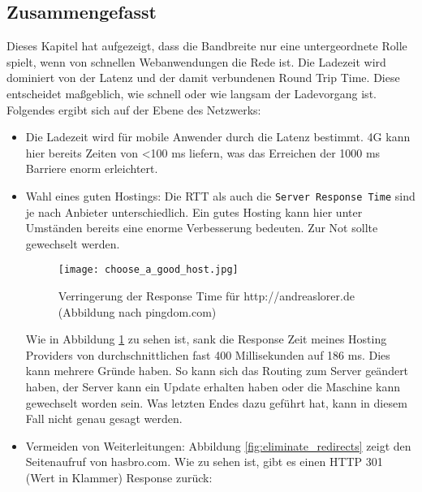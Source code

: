 
	\subsection{Zusammengefasst} %
	\label{sub:zusammengefasst_grundlagen}
		Dieses Kapitel hat aufgezeigt, dass die Bandbreite nur eine untergeordnete Rolle spielt, wenn von schnellen Webanwendungen die Rede ist. Die Ladezeit wird dominiert von der Latenz und der damit verbundenen Round Trip Time. Diese entscheidet maßgeblich, wie schnell oder wie langsam der Ladevorgang ist.
		Folgendes ergibt sich auf der Ebene des Netzwerks:
		\begin{itemize}

			\item Die Ladezeit wird für mobile Anwender durch die Latenz bestimmt. 4G kann hier bereits Zeiten von <100 ms liefern, was das Erreichen der 1000 ms Barriere enorm erleichtert.

			\item Wahl eines guten Hostings: Die RTT als auch die \texttt{Server Response Time} sind je nach Anbieter unterschiedlich. Ein gutes Hosting kann hier unter Umständen bereits eine enorme Verbesserung bedeuten. Zur Not sollte gewechselt werden.

			\begin{figure}[htbp]
				\begin{center}
					\texttt{[image: choose\_a\_good\_host.jpg]}
					\caption{Verringerung der Response Time für http://andreaslorer.de (Abbildung nach pingdom.com)}
					\label{fig:choose_a_good_host}
				\end{center}
			\end{figure}
			
			Wie in Abbildung \ref{fig:choose_a_good_host} zu sehen ist, sank die Response Zeit meines Hosting Providers von durchschnittlichen fast 400 Millisekunden auf 186 ms. Dies kann mehrere Gründe haben. So kann sich das Routing zum Server geändert haben, der Server kann ein Update erhalten haben oder die Maschine kann gewechselt worden sein. Was letzten Endes dazu geführt hat, kann in diesem Fall nicht genau gesagt werden.

			\item Vermeiden von Weiterleitungen: Abbildung \ref{fig:eliminate_redirects} zeigt den Seitenaufruf von hasbro.com. Wie zu sehen ist, gibt es einen HTTP 301 (Wert in Klammer) Response zurück: 


\end{itemize}
